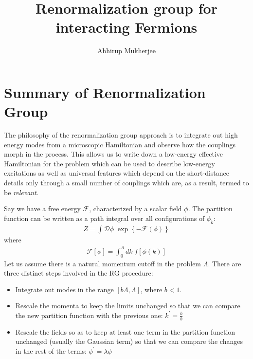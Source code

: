\documentclass[14pt]{extarticle}
\title{Renormalization group for interacting Fermions}
\author{Abhirup Mukherjee}
\begin{document}
\maketitle
\section{Summary of Renormalization Group}
The philosophy of the renormalization group approach is to integrate out high energy modes from a microscopic Hamiltonian and observe how the couplings morph in the process. This allows us to write down a low-energy effective Hamiltonian for the problem which can be used to describe low-energy excitations as well as universal features which depend on the short-distance details only through a small number of couplings which are, as a result, termed to be \textit{relevant}.

Say we have a free energy \(\mathcal{F}\), characterized by a scalar field \(\phi\). The partition function can be written as a path integral over all configurations of \(\phi_k\):
\begin{equation}\begin{aligned}
\label{oldpart}
Z = \int \mathcal{D}\phi \;\exp\left\{-\mathcal{F}(\phi)\right\}
\end{aligned}\end{equation}
where 
\begin{equation}\begin{aligned}
\mathcal{F}[\phi] = \int_0^\Lambda dk \;f[\phi(k)]
\end{aligned}\end{equation}
Let us assume there is a natural momentum cutoff in the problem \(\Lambda\). There are three distinct steps involved in the RG procedure:
\begin{itemize}
	\item Integrate out modes in the range \(\left[b\Lambda,\Lambda\right]\), where \(b < 1\).
	\item Rescale the momenta to keep the limits unchanged so that we can compare the new partition function with the previous one: \(k^\prime = \frac{k}{b}\)
	\item Rescale the fields so as to keep at least one term in the partition function unchanged (usually the Gaussian term) so that we can compare the changes in the rest of the terms: \(\phi^\prime = \lambda\phi\)
\end{itemize}
\end{document}
